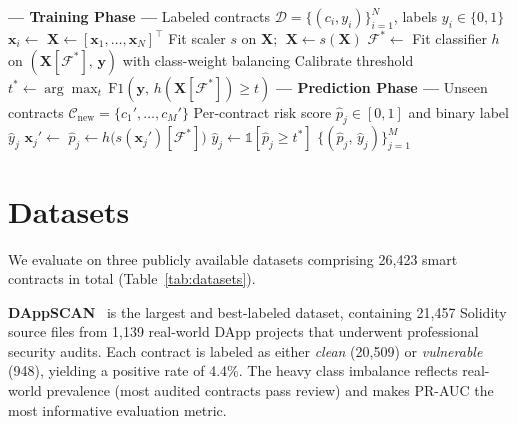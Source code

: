 \documentclass[11pt,a4paper]{article}
\newcommand{\MethodName}{SCAFE\xspace}
\begin{document}
\begin{algorithm}[t]
\caption{\MethodName: Compilation-Free Vulnerability Classification}
\label{alg:pipeline}
\begin{algorithmic}[1]
\small
\Statex \textbf{--- Training Phase ---}
\Require Labeled contracts $\mathcal{D} = \{(c_i, y_i)\}_{i=1}^{N}$, labels $y_i \in \{0,1\}$
    \State $\mathbf{x}_i \gets$  
\EndFor
\State $\mathbf{X} \gets [\mathbf{x}_1, \ldots, \mathbf{x}_N]^{\top}$
\State Fit scaler $s$ on $\mathbf{X}$; $\;\mathbf{X} \gets s(\mathbf{X})$ 
\State $\mathcal{F}^{*} \gets$  
\State Fit classifier $h$ on $(\mathbf{X}[\mathcal{F}^{*}],\, \mathbf{y})$ with class-weight balancing
\State Calibrate threshold $t^{*} \gets \arg\max_t\, \mathrm{F1}(\mathbf{y},\, h(\mathbf{X}[\mathcal{F}^{*}]) \ge t)$
\Statex
\Statex \textbf{--- Prediction Phase ---}
\Require Unseen contracts $\mathcal{C}_{\mathrm{new}} = \{c_1', \ldots, c_M'\}$
\Ensure Per-contract risk score $\hat{p}_j \in [0,1]$ and binary label $\hat{y}_j$
    \State $\mathbf{x}_j' \gets$  
    \State $\hat{p}_j \gets h\bigl(s(\mathbf{x}_j')[\mathcal{F}^{*}]\bigr)$ 
    \State $\hat{y}_j \gets \mathbb{1}[\hat{p}_j \ge t^{*}]$ 
\EndFor
\State \Return $\{(\hat{p}_j,\, \hat{y}_j)\}_{j=1}^{M}$
\end{algorithmic}
\end{algorithm}

\section{Datasets}
\label{sec:data}



We evaluate on three publicly available datasets comprising 26,423 smart contracts in total (Table~\ref{tab:datasets}).

\textbf{DAppSCAN}~\cite{wu2023dappscan} is the largest and best-labeled dataset, containing 21,457 Solidity source files from 1,139 real-world DApp projects that underwent professional security audits.
Each contract is labeled as either \emph{clean} (20,509) or \emph{vulnerable} (948), yielding a positive rate of 4.4\%.
The heavy class imbalance reflects real-world prevalence (most audited contracts pass review) and makes PR-AUC the most informative evaluation metric.
\end{document}
